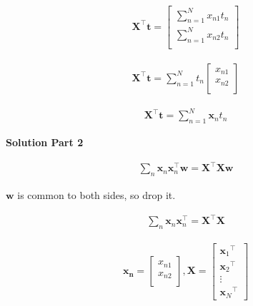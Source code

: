 \documentclass[10pt]{article}
\begin{document}
\begin{enumerate}
\begin{eqnarray*}
	\mathbf{X}^\top\mathbf{t} =
	\begin{bmatrix}
	{\sum_{n=1}^N x_{n1} t_{n}}\\
	{\sum_{n=1}^N x_{n2} t_{n}}\\
	\end{bmatrix}
\end{eqnarray*}

\begin{eqnarray*}
	\mathbf{X}^\top\mathbf{t}  =
	{\sum_{n=1}^N t_{n}
	\begin{bmatrix}
	x_{n1} \\
    x_{n2} \\
	\end{bmatrix}}
\end{eqnarray*}

\begin{eqnarray*}
	\mathbf{X}^\top\mathbf{t} =
	{\sum_{n=1}^N \mathbf{x}_{n} t_{n}}
\end{eqnarray*}

\newpage

{\bf Solution Part 2}

\begin{eqnarray*}
\sum_{n} \mathbf{x}_n \mathbf{x}_n ^\top \mathbf{w} = \mathbf{X}^\top\mathbf{X} \mathbf{w}
\end{eqnarray*}

$\mathbf{w}$ is common to both sides, so drop it.

\begin{eqnarray*}
\sum_{n} \mathbf{x}_n \mathbf{x}_n ^\top = \mathbf{X}^\top\mathbf{X}
\end{eqnarray*}

\begin{eqnarray*}
	\mathbf{x_n} =
	\begin{bmatrix}
	x_{n1} \\
	x_{n2} \\
	\end{bmatrix}
	,
	\mathbf{X} =
    \begin{bmatrix}
    {\mathbf{x}_{1}}^\top \\[0.3em]
    {\mathbf{x}_{2}}^\top \\[0.3em]
    \vdots \\[0.3em]
    {\mathbf{x}_{N}}^\top
    \end{bmatrix}
\end{eqnarray*}


\end{enumerate}
\end{document}
